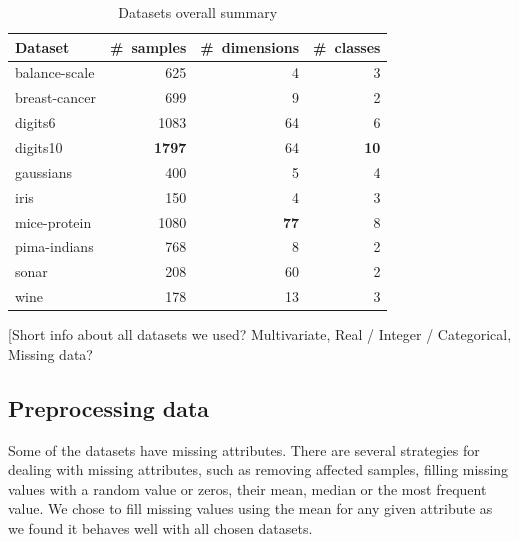 \documentclass[12pt,a4paper]{report}
\begin{document}
\begin{table}[ht] \centering
\begin{tabular}{lrrr}
\hline
Dataset & \#~samples & \#~dimensions & \#~classes \\
\hline
balance-scale           & 625   & 4    & 3  \\
breast-cancer           & 699   & 9    & 2  \\
digits6                 & 1083  & 64   & 6  \\
digits10                & \textbf{1797}  & 64  & \textbf{10} \\
gaussians               & 400   & 5   & 4  \\
iris                    & 150   & 4    & 3  \\
mice-protein            & 1080  & \textbf{77}   & 8  \\
pima-indians            & 768   & 8    & 2  \\
sonar                   & 208   & 60   & 2  \\
wine                    & 178   & 13   & 3  \\
\hline
\end{tabular}
\caption{Datasets overall summary} \label{tab:datasets}
\end{table}

[Short info about all datasets we used? Multivariate, Real / Integer / Categorical, Missing data? %

\subsection{Preprocessing data} \label{chap:exp:preprocessing}
Some of the datasets have missing attributes. There are several strategies for dealing with missing attributes, such as removing affected samples, filling missing values with a random value or zeros, their mean, median or the most frequent value. We chose to fill missing values using the mean for any given attribute as we found it behaves well with all chosen datasets.
\end{document}
